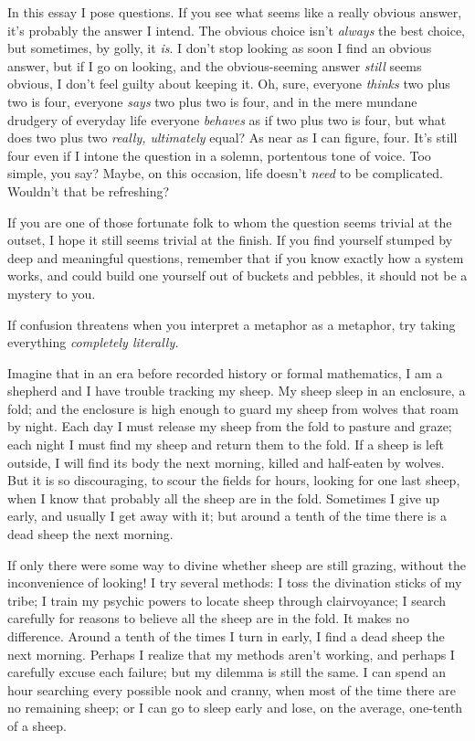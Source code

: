 {
 In this essay I pose questions. If you see what seems like a
really obvious answer, it's probably the answer I
intend. The obvious choice isn't \textit{always} the
best choice, but sometimes, by golly, it \textit{is}. I
don't stop looking as soon I find an obvious answer,
but if I go on looking, and the obvious-seeming answer \textit{still}
seems obvious, I don't feel guilty about keeping it.
Oh, sure, everyone \textit{thinks} two plus two is four, everyone
\textit{says} two plus two is four, and in the mere mundane drudgery of
everyday life everyone \textit{behaves} as if two plus two is four, but
what does two plus two \textit{really, ultimately} equal? As near as I
can figure, four. It's still four even if I intone the
question in a solemn, portentous tone of voice. Too simple, you say?
Maybe, on this occasion, life doesn't \textit{need} to
be complicated. Wouldn't that be refreshing?}

{
 If you are one of those fortunate folk to whom the question seems
trivial at the outset, I hope it still seems trivial at the finish. If
you find yourself stumped by deep and meaningful questions, remember
that if you know exactly how a system works, and could build one
yourself out of buckets and pebbles, it should not be a mystery to
you.}

{
 If confusion threatens when you interpret a metaphor as a
metaphor, try taking everything \textit{completely literally.}}

{
 Imagine that in an era before recorded history or formal
mathematics, I am a shepherd and I have trouble tracking my sheep. My
sheep sleep in an enclosure, a fold; and the enclosure is high enough
to guard my sheep from wolves that roam by night. Each day I must
release my sheep from the fold to pasture and graze; each night I must
find my sheep and return them to the fold. If a sheep is left outside,
I will find its body the next morning, killed and half-eaten by wolves.
But it is so discouraging, to scour the fields for hours, looking for
one last sheep, when I know that probably all the sheep are in the
fold. Sometimes I give up early, and usually I get away with it; but
around a tenth of the time there is a dead sheep the next morning.}

{
 If only there were some way to divine whether sheep are still
grazing, without the inconvenience of looking! I try several methods: I
toss the divination sticks of my tribe; I train my psychic powers to
locate sheep through clairvoyance; I search carefully for reasons to
believe all the sheep are in the fold. It makes no difference. Around a
tenth of the times I turn in early, I find a dead sheep the next
morning. Perhaps I realize that my methods aren't
working, and perhaps I carefully excuse each failure; but my dilemma is
still the same. I can spend an hour searching every possible nook and
cranny, when most of the time there are no remaining sheep; or I can go
to sleep early and lose, on the average, one-tenth of a sheep.}


